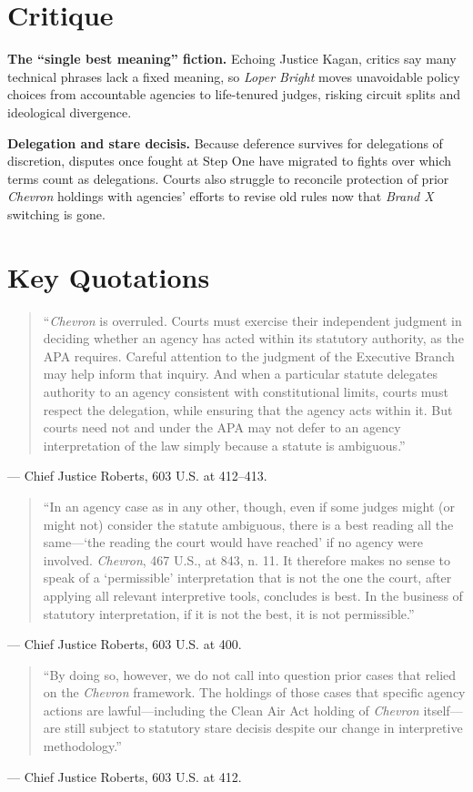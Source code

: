 \documentclass[12pt]{article}
\begin{document}
\section{Critique}

\textbf{The ``single best meaning'' fiction.} Echoing Justice Kagan, critics say many technical phrases lack a fixed meaning, so \textit{Loper Bright} moves unavoidable policy choices from accountable agencies to life-tenured judges, risking circuit splits and ideological divergence.

\textbf{Delegation and stare decisis.} Because deference survives for delegations of discretion, disputes once fought at Step One have migrated to fights over which terms count as delegations. Courts also struggle to reconcile protection of prior \textit{Chevron} holdings with agencies' efforts to revise old rules now that \textit{Brand X} switching is gone.

\section{Key Quotations}

\begin{quote}
``\textit{Chevron} is overruled. Courts must exercise their independent judgment in deciding whether an agency has acted within its statutory authority, as the APA requires. Careful attention to the judgment of the Executive Branch may help inform that inquiry. And when a particular statute delegates authority to an agency consistent with constitutional limits, courts must respect the delegation, while ensuring that the agency acts within it. But courts need not and under the APA may not defer to an agency interpretation of the law simply because a statute is ambiguous.''
\end{quote}
\noindent --- Chief Justice Roberts, 603 U.S. at 412--413.

\begin{quote}
``In an agency case as in any other, though, even if some judges might (or might not) consider the statute ambiguous, there is a best reading all the same---`the reading the court would have reached' if no agency were involved. \textit{Chevron}, 467 U.S., at 843, n. 11. It therefore makes no sense to speak of a `permissible' interpretation that is not the one the court, after applying all relevant interpretive tools, concludes is best. In the business of statutory interpretation, if it is not the best, it is not permissible.''
\end{quote}
\noindent --- Chief Justice Roberts, 603 U.S. at 400.

\begin{quote}
``By doing so, however, we do not call into question prior cases that relied on the \textit{Chevron} framework. The holdings of those cases that specific agency actions are lawful---including the Clean Air Act holding of \textit{Chevron} itself---are still subject to statutory stare decisis despite our change in interpretive methodology.''
\end{quote}
\noindent --- Chief Justice Roberts, 603 U.S. at 412.
\end{document}
